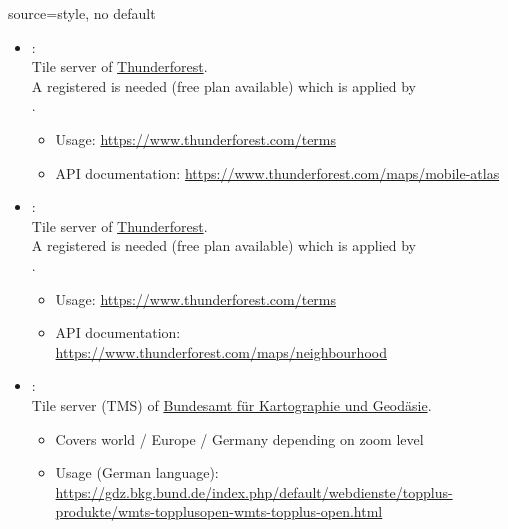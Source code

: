 \begin{docMrcKey}[supply]{source}{=}{style, no default}
\begin{itemize}
  \item{}:\\
    Tile server of \href{https://www.thunderforest.com}{Thunderforest}.\\
    A registered  is needed (free plan available)
    which is applied by\\
    .
    \begin{itemize}
    \item Usage: \url{https://www.thunderforest.com/terms}
    \item API documentation: \url{https://www.thunderforest.com/maps/mobile-atlas}
    \end{itemize}

  \item{}:\\
    Tile server of \href{https://www.thunderforest.com}{Thunderforest}.\\
    A registered  is needed (free plan available)
    which is applied by\\
    .
    \begin{itemize}
    \item Usage: \url{https://www.thunderforest.com/terms}
    \item API documentation: \url{https://www.thunderforest.com/maps/neighbourhood}
    \end{itemize}

\clearpage
  \item{}:\\
    Tile server (TMS) of \href{http://www.bkg.bund.de}{Bundesamt f\"{u}r Kartographie und Geod\"{a}sie}.
    \begin{itemize}
    \item Covers world / Europe / Germany depending on zoom level
    \item Usage (German language): \url{https://gdz.bkg.bund.de/index.php/default/webdienste/topplus-produkte/wmts-topplusopen-wmts-topplus-open.html}
    \end{itemize}


\end{itemize}
\end{docMrcKey}
